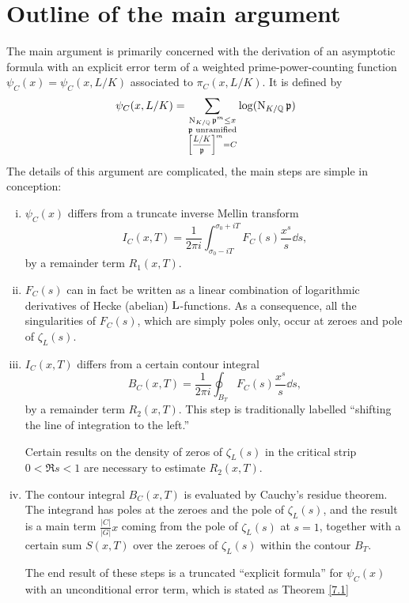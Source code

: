 \documentclass[./main]{subfiles}
\begin{document}
\section{Outline of the main argument}

The main argument is primarily concerned with the derivation of an asymptotic formula with an explicit error term of a weighted prime-power-counting function $\psi_C(x) = \psi_C(x, L/K)$ associated to $\pi_C(x, L/K)$.
It is defined by
\[
\psi_C(x, L/K) = \sum_{\substack{\norm_{K/\Q}  \p^m \leq x \\ \p\text{ unramified} \\ \Scale[0.75]{\ArtinSymbol{L/K}{\p}}^m = C }} \log(\norm_{K/\Q} \p)
\]
The details of this argument are complicated, the main steps are simple in conception:
\begin{enumerate}[(i)]
    \item $\psi_C(x)$ differs from a truncate inverse Mellin transform
    \[
    I_C(x, T) = \frac{1}{2\pi i} \int_{\sigma_0 - iT}^{\sigma_0 + iT} F_C(s) \frac{x^s}{s} \dd s,
    \]
    by a remainder term $R_1(x, T)$.
    
    \item $F_C(s)$ can in fact be written as a linear combination of logarithmic derivatives of Hecke (abelian) $\operatorname{L}$-functions.
    As a consequence, all the singularities of $F_C(s)$, which are simply poles only, occur at zeroes and pole of $\zeta_L(s)$.
    
    \item $I_C(x, T)$ differs from a certain contour integral
    \[
    B_C(x, T) = \frac{1}{2\pi i} \oint_{B_T} F_C(s) \frac{x^s}{s} \dd s,
    \]
    by a remainder term $R_2(x, T)$.
    This step is traditionally labelled ``shifting the line of integration to the left.''
    
    Certain results on the density of zeros of $\zeta_L(s)$ in the critical strip \newline $0 < \Re s < 1$ are necessary to estimate $R_2(x, T)$.
    
    \item The contour integral $B_C(x, T)$ is evaluated by Cauchy's residue theorem.
    The integrand has poles at the zeroes and the pole of $\zeta_L(s)$, and the result is a main term $\frac{|C|}{|G|}x$ coming from the pole of $\zeta_L(s)$ at $s = 1$, together with a certain sum $S(x, T)$ over the zeroes of $\zeta_L(s)$ within the contour $B_T$.
    
    The end result of these steps is a truncated ``explicit formula'' for $\psi_C(x)$ with an unconditional error term, which is stated as Theorem \ref{7.1}
    

\end{enumerate}
\end{document}
